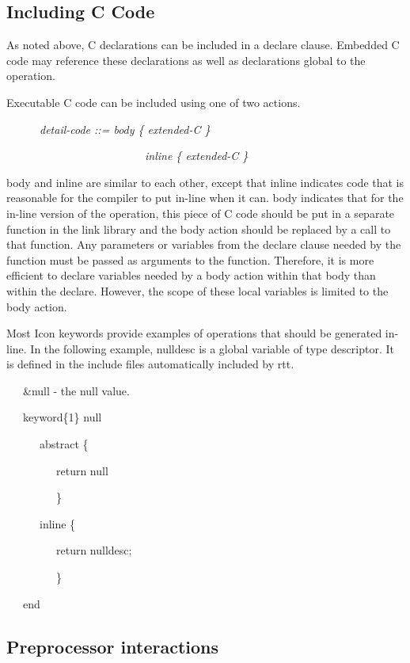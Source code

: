\subsection{Including C Code}

As noted above, C declarations can be included in a declare
clause. Embedded C code may reference these declarations as well as
declarations global to the operation.

Executable C code can be included using one of two actions. 

{\ttfamily\mdseries
\ \ \ \ \ \ \textit{detail-code ::= body \{ extended-C \} {\textbar}}}

{\ttfamily\mdseries
\ \ \ \ \ \ \ \ \ \ \ \ \ \ \ \ \ \ \ \ \ \ \ \ \ \textit{inline \{ extended-C \}}}


body and inline are similar to each other, except that inline
indicates code that is reasonable for the compiler to put in-line when
it can. body indicates that for the in-line version of the operation,
this piece of C code should be put in a separate function in the link
library and the body action should be replaced by a call to that
function. Any parameters or variables from the declare clause needed
by the function must be passed as arguments to the function.
Therefore, it is more efficient to declare variables needed by a body
action within that body than within the declare.  However, the scope
of these local variables is limited to the body action.

Most Icon keywords provide examples of operations that should be
generated in-line. In the following example, nulldesc is a global
variable of type descriptor. It is defined in the include files
automatically included by rtt.

{\ttfamily\mdseries
\ \ \ \&null - the null value.}

{\ttfamily\mdseries
\ \ \ keyword\{1\} null}

{\ttfamily\mdseries
\ \ \ \ \ \ abstract \{}

{\ttfamily\mdseries
\ \ \ \ \ \ \ \ \ return null}

{\ttfamily\mdseries
\ \ \ \ \ \ \ \ \ \}}

{\ttfamily\mdseries
\ \ \ \ \ \ inline \{}

{\ttfamily\mdseries
\ \ \ \ \ \ \ \ \ return nulldesc;}

{\ttfamily\mdseries
\ \ \ \ \ \ \ \ \ \}}

{\ttfamily\mdseries
\ \ \ end}

\subsection{Preprocessor interactions}

